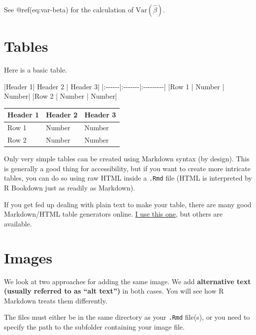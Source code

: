 \documentclass[
  letterpaper,
  oneside]{book}
\newenvironment{Shaded}{\begin{snugshade}}{\end{snugshade}}
\newcommand{\NormalTok}[1]{\textcolor[rgb]{0.00,0.23,0.31}{#1}}
\numberwithin{equation}{section}
\numberwithin{figure}{section}
\theoremstyle{break}
\theoremstyle{plain}
\theoremstyle{remark}
\begin{document}
See @ref(eq:var-beta) for the calculation of
\(\mathrm{Var}(\hat{\beta})\).

\section{Tables}\label{tables}

Here is a basic table.

\begin{Shaded}
\begin{Highlighting}[]
\NormalTok{|Header 1| Header 2 | Header 3|}
\NormalTok{|:{-}{-}{-}{-}{-}{-}|:{-}{-}{-}{-}{-}{-}{-}|:{-}{-}{-}{-}{-}{-}{-}{-}{-}|}
\NormalTok{|Row 1 | Number | Number|}
\NormalTok{|Row 2 | Number | Number|}
\end{Highlighting}
\end{Shaded}

\begin{longtable}[]{@{}lll@{}}
\toprule\noalign{}
Header 1 & Header 2 & Header 3 \\
\midrule\noalign{}
\endhead
\bottomrule\noalign{}
\endlastfoot
Row 1 & Number & Number \\
Row 2 & Number & Number \\
\end{longtable}

Only very simple tables can be created using Markdown syntax (by
design). This is generally a good thing for accessibility, but if you
want to create more intricate tables, you can do so using raw HTML
inside a \texttt{.Rmd} file (HTML is interpreted by R Bookdown just as
readily as Markdown).

If you get fed up dealing with plain text to make your table, there are
many good Markdown/HTML table generators online.
\href{https://www.tablesgenerator.com/html_tables?target=_blank}{I use
this one}, but others are available.

\section{Images}\label{images}

We look at two approaches for adding the same image. We add
\textbf{alternative text (usually referred to as ``alt text'')} in both
cases. You will see how R Markdown treats them differently.

The files must either be in the same directory as your \texttt{.Rmd}
file(s), or you need to specify the path to the subfolder containing
your image file.
\end{document}
